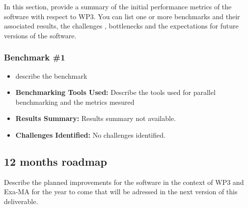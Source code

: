 In this section, provide a summary of the initial performance metrics of the software with respect to WP3.
You can list one or more benchmarks and their associated results, the challenges , bottlenecks and the expectations for future versions of the software.



\subsubsection{Benchmark \#1}
\begin{itemize}
    \item describe the benchmark
    \item \textbf{Benchmarking Tools Used:} Describe the tools used for parallel benchmarking and the metrics mesured
    \item \textbf{Results Summary:} Results summary not available.
    \item \textbf{Challenges Identified:} No challenges identified.
\end{itemize}

\subsection{12 months roadmap}
\label{sec:WP3:FreeFem++:roadmap}

Describe the planned improvements  for the software in the context of WP3 and Exa-MA for the year to come that will be adressed in the next version of this deliverable.